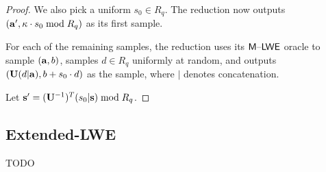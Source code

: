 \documentclass[oribibl,envcountsect,envcountsame]{llncs}
\begin{document}
\begin{proof}
We also pick a uniform $s_0 \in R_q$. The reduction now outputs $(\mathbf{a}',\kappa \cdot s_0 \bmod{R_q})$ as 
its first sample. 

For each of the remaining samples, the reduction uses its $\mathsf{M \text{\textendash} LWE}$ oracle to sample $(\mathbf{a}, b)$, 
samples $d \in R_q$ uniformly at random, and outputs $(\mathbf{U}(d|\mathbf{a}), b + s_0 \cdot d)$ as the sample, where $|$ denotes concatenation.

Let $\mathbf{s}' = (\mathbf{U}^{-1})^{T}(s_0|\mathbf{s}) \bmod{R_q}$. 




\end{proof}

\subsection{Extended-LWE}

TODO









\end{document}
